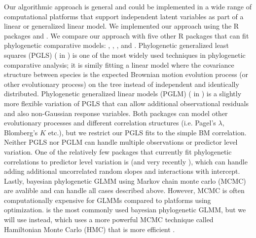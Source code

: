 \documentclass[12pt]{article}
\begin{document}
Our algorithmic approach is general and could be implemented in a wide range of computational platforms that support independent latent variables as part of a linear or generalized linear model. 
We implemented our approach using the R packages  \citep{bates2015fitting} and  \citep{brooks2017glmmTMB}.
We compare our approach with five other R packages that can fit phylogenetic comparative models:  \citep{pinheiro2014r},  \citep{ho2014phylolm},  \citep{pearse2015pez}, and  \citep{burkner2016brms}.
Phylogenetic generalized least squares (PGLS) ( in ) is one of the most widely used techniques in phylogenetic comparative analysis; it is simily fitting a linear model where the covariance structure between species is the expected Brownian motion evolution process (or other evolutionary process) on the tree instead of independent and identically distributed. 
Phylogenetic generalized linear models (PGLM) ( in ) is a slightly more flexible variation of PGLS that can allow additional observational residuals and also non-Gaussian response variables.
Both packages can model other evolutionary processes and different correlation structures (i.e. Pagel's $\lambda$, Blomberg's $K$ etc.), but we restrict our PGLS fits to the simple BM correlation. 
Neither PGLS nor PGLM can handle multiple observations or predictor level variation.
One of the relatively few packages that currently fit phylogenetic correlations to predictor level variation is  (and very recently ), which can handle adding additional uncorrelated random slopes and interactions with intercept.
Lastly, bayesian phylogenetic GLMM using Markov chain monte carlo (MCMC) are avalible and can handle all cases described above. 
However, MCMC is often computationally expensive for GLMMs compared to platforms using optimization.
 \citep{hadfield2010general} is the most commonly used bayesian phylogenetic GLMM, but we will use  instead, which uses a more powerful MCMC technique called Hamiltonian Monte Carlo (HMC) \citep{duane1987hybrid} that is more efficient \citep{li2018fitting}.
 
\end{document}
